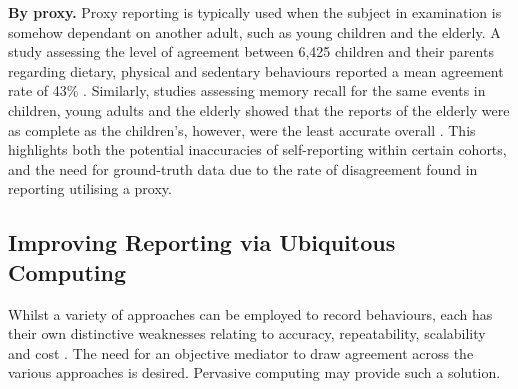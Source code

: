 \textbf{By proxy.} Proxy reporting is typically used when the subject in examination is somehow dependant on another adult, such as young children and the elderly. A study assessing the level of agreement between 6,425 children and their parents regarding dietary, physical and sedentary behaviours reported a mean agreement rate of 43\% \cite{Rebholz2014}. Similarly, studies assessing memory recall for the same events in children, young adults and the elderly showed that the reports of the elderly were as complete as the children’s, however, were the least accurate overall \cite{Gawrylowicz2014}. This highlights both the potential inaccuracies of self-reporting within certain cohorts, and the need for ground-truth data due to the rate of disagreement found in reporting utilising a proxy.

\subsection{Improving Reporting via Ubiquitous Computing}
Whilst a variety of approaches can be employed to record behaviours, each has their own distinctive weaknesses relating to accuracy, repeatability, scalability and cost \cite{Prince2008}. The need for an objective mediator to draw agreement across the various approaches is desired. Pervasive computing may provide such a solution.

